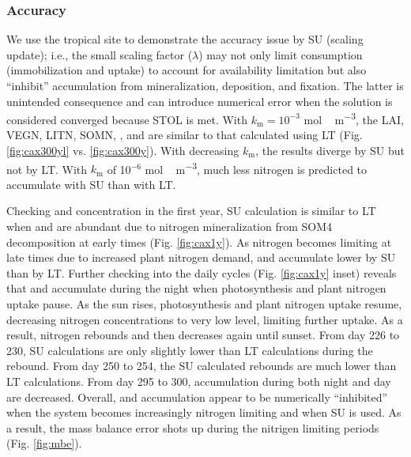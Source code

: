 \documentclass[gmd, manuscript]{copernicus}
\begin{document}
\subsubsection{Accuracy}
We use the tropical site to demonstrate the accuracy issue by SU (scaling
update); i.e., the small scaling factor ($\lambda$) may not only limit 
consumption (immobilization and uptake) to account for availability limitation
but also ``inhibit'' accumulation from mineralization, deposition, and fixation.
The latter is unintended consequence and can introduce numerical error when the
solution is considered converged because STOL is met. With $k_\text{m} =
10^{-3}$ \unit{mol\,m^{-3}}, the LAI, VEGN, LITN, SOMN, , and
 are similar to that calculated using LT (Fig.
\ref{fig:cax300yl} vs. \ref{fig:cax300y}). With decreasing $k_\text{m}$, the
results diverge by SU but not by LT. With $k_\text{m}$ of 10$^{-6}$
\unit{mol\,m^{-3}}, much less nitrogen is predicted to accumulate with SU than
with LT. 
  
Checking  and  concentration in the first year, SU
calculation is similar to LT when  and  are abundant
due to nitrogen mineralization from SOM4 decomposition at early times (Fig.
\ref{fig:cax1y}). As nitrogen becomes limiting at late times due to increased
plant nitrogen demand,  and  accumulate lower by SU
than by LT. Further checking into the daily cycles (Fig. \ref{fig:cax1y}
inset) reveals that  and  accumulate during the night when
photosynthesis and plant nitrogen uptake pause. As the sun rises,
photosynthesis and plant nitrogen uptake resume, decreasing nitrogen
concentrations to very low level, limiting further uptake. As a result,
nitrogen rebounds and then decreases again until sunset. From day 226 to 230,
SU calculations are only slightly lower than LT calculations during the
rebound. From day 250 to 254, the SU calculated rebounds are much lower than LT
calculations. From day 295 to 300, accumulation during both night and day are
decreased. Overall,  and  accumulation appear to be
numerically ``inhibited'' when the system becomes increasingly nitrogen limiting
and when SU is used. As a result, the mass balance error shots up during the
nitrigen limiting periods (Fig. \ref{fig:mbe}). 
\end{document}
